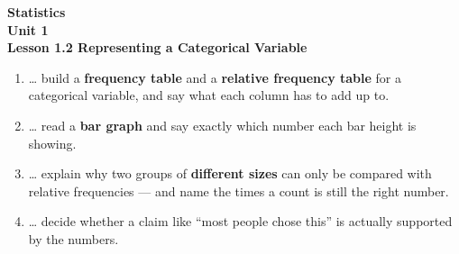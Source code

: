 \documentclass[12pt]{article}
\begin{document}
\vspace{-0.8in}

\begin{center}
  {\color{white}\textbf{\LARGE Statistics}}\\[4pt]
  {\color{skymid}\large\textbf{Unit 1}}\\[6pt]
  {\color{white}\textbf{\large Lesson 1.2 \quad Representing a Categorical Variable}}
\end{center}

\vspace{0.22in}
\namedateperiod
\vspace{0.18in}

\boxguard[14]
\begin{learningtargetbox}
\small
\begin{enumerate}[leftmargin=1.5em, itemsep=5pt]
  \item \ldots{} build a \textbf{frequency table} and a \textbf{relative frequency table} for a
        categorical variable, and say what each column has to add up to.
  \item \ldots{} read a \textbf{bar graph} and say exactly which number each bar height is
        showing.
  \item \ldots{} explain why two groups of \textbf{different sizes} can only be compared with
        relative frequencies --- and name the times a count is still the right number.
  \item \ldots{} decide whether a claim like ``most people chose this'' is actually supported
        by the numbers.
\end{enumerate}
\end{learningtargetbox}

\vspace{0.14in}
\end{document}
